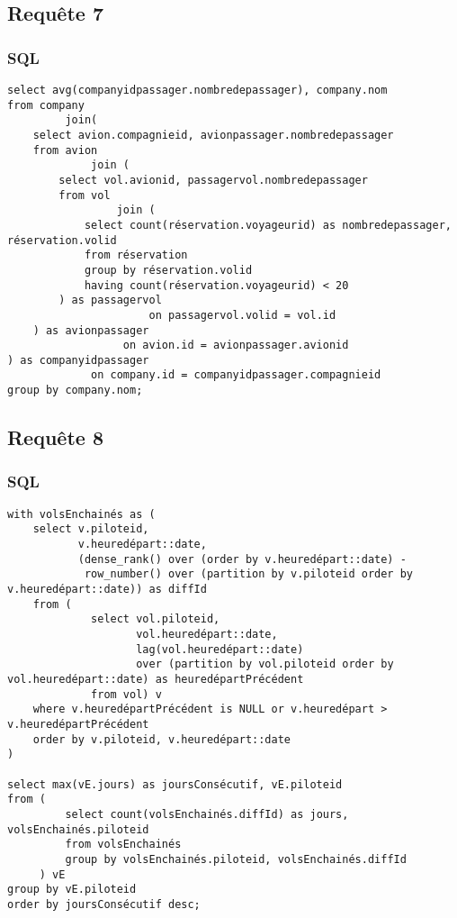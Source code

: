 \documentclass[french, utf8]{article}
\begin{document}
\subsection{Requête 7}
\subsubsection{SQL}
\begin{verbatim}
select avg(companyidpassager.nombredepassager), company.nom
from company
         join(
    select avion.compagnieid, avionpassager.nombredepassager
    from avion
             join (
        select vol.avionid, passagervol.nombredepassager
        from vol
                 join (
            select count(réservation.voyageurid) as nombredepassager, réservation.volid
            from réservation
            group by réservation.volid
            having count(réservation.voyageurid) < 20
        ) as passagervol
                      on passagervol.volid = vol.id
    ) as avionpassager
                  on avion.id = avionpassager.avionid
) as companyidpassager
             on company.id = companyidpassager.compagnieid
group by company.nom;

\end{verbatim}


\newpage

\subsection{Requête 8}
\subsubsection{SQL}
\begin{verbatim}
with volsEnchainés as (
    select v.piloteid,
           v.heuredépart::date,
           (dense_rank() over (order by v.heuredépart::date) -
            row_number() over (partition by v.piloteid order by v.heuredépart::date)) as diffId
    from (
             select vol.piloteid,
                    vol.heuredépart::date,
                    lag(vol.heuredépart::date)
                    over (partition by vol.piloteid order by vol.heuredépart::date) as heuredépartPrécédent
             from vol) v
    where v.heuredépartPrécédent is NULL or v.heuredépart > v.heuredépartPrécédent
    order by v.piloteid, v.heuredépart::date
)

select max(vE.jours) as joursConsécutif, vE.piloteid
from (
         select count(volsEnchainés.diffId) as jours, volsEnchainés.piloteid
         from volsEnchainés
         group by volsEnchainés.piloteid, volsEnchainés.diffId
     ) vE
group by vE.piloteid
order by joursConsécutif desc;
\end{verbatim}
\end{document}

